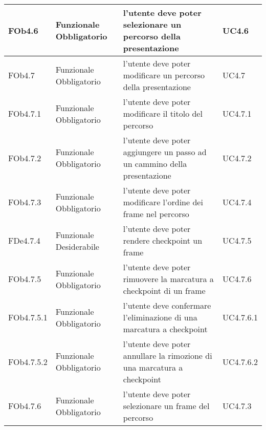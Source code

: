 \begin{longtable}{|l|p{2.5cm}|p{5cm}|p{3.5cm}|}
\hline
FOb4.6 & Funzionale \linebreak Obbligatorio & l'utente deve poter selezionare un percorso della presentazione & UC4.6 \linebreak  \\
\hline
FOb4.7 & Funzionale \linebreak Obbligatorio & l'utente deve poter modificare un percorso della presentazione & UC4.7 \linebreak  \\
\hline
FOb4.7.1 & Funzionale \linebreak Obbligatorio & l'utente deve poter modificare il titolo del percorso & UC4.7.1 \linebreak  \\
\hline
FOb4.7.2 & Funzionale \linebreak Obbligatorio & l'utente deve poter aggiungere un passo ad un cammino della presentazione & UC4.7.2 \linebreak  \\
\hline
FOb4.7.3 & Funzionale \linebreak Obbligatorio & l'utente deve poter modificare l'ordine dei frame nel percorso & UC4.7.4 \linebreak  \\
\hline
FDe4.7.4 & Funzionale \linebreak Desiderabile & l'utente deve poter rendere checkpoint un frame & UC4.7.5 \linebreak  \\
\hline
FOb4.7.5 & Funzionale \linebreak Obbligatorio & l'utente deve poter rimuovere la marcatura a checkpoint di un frame & UC4.7.6 \linebreak  \\
\hline
FOb4.7.5.1 & Funzionale \linebreak Obbligatorio & l'utente deve confermare l'eliminazione di una marcatura a checkpoint & UC4.7.6.1 \linebreak  \\
\hline
FOb4.7.5.2 & Funzionale \linebreak Obbligatorio & l'utente deve poter annullare la rimozione di una marcatura a checkpoint & UC4.7.6.2 \linebreak  \\
\hline
FOb4.7.6 & Funzionale \linebreak Obbligatorio & l'utente deve poter selezionare un frame del percorso & UC4.7.3 \linebreak  \\

\end{longtable}
